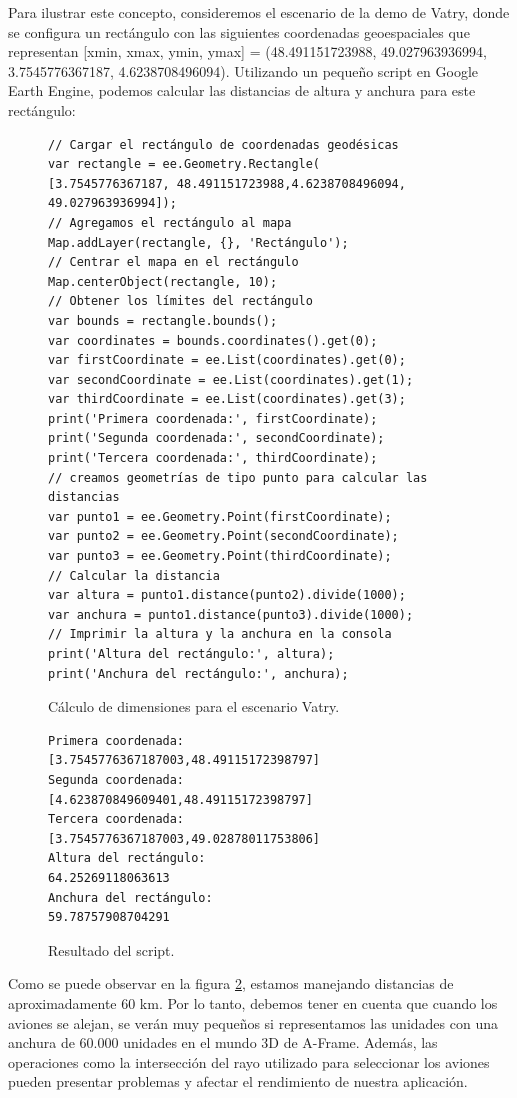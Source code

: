 \documentclass[a4paper, 11pt]{book}
\begin{document}
Para ilustrar este concepto, consideremos el escenario de la demo de Vatry, donde se configura un rectángulo con las siguientes coordenadas geoespaciales que representan [xmin, xmax, ymin, ymax] = (48.491151723988, 49.027963936994, 3.7545776367187, 4.6238708496094). Utilizando un pequeño script en Google Earth Engine, podemos calcular las distancias de altura y anchura para este rectángulo:
\begin{figure}[h]
\centering
\begin{verbatim}
// Cargar el rectángulo de coordenadas geodésicas
var rectangle = ee.Geometry.Rectangle(
[3.7545776367187, 48.491151723988,4.6238708496094, 49.027963936994]);
// Agregamos el rectángulo al mapa
Map.addLayer(rectangle, {}, 'Rectángulo');
// Centrar el mapa en el rectángulo
Map.centerObject(rectangle, 10);
// Obtener los límites del rectángulo
var bounds = rectangle.bounds();
var coordinates = bounds.coordinates().get(0);
var firstCoordinate = ee.List(coordinates).get(0);
var secondCoordinate = ee.List(coordinates).get(1);
var thirdCoordinate = ee.List(coordinates).get(3);
print('Primera coordenada:', firstCoordinate);
print('Segunda coordenada:', secondCoordinate);
print('Tercera coordenada:', thirdCoordinate);
// creamos geometrías de tipo punto para calcular las distancias
var punto1 = ee.Geometry.Point(firstCoordinate);
var punto2 = ee.Geometry.Point(secondCoordinate);
var punto3 = ee.Geometry.Point(thirdCoordinate);
// Calcular la distancia
var altura = punto1.distance(punto2).divide(1000);
var anchura = punto1.distance(punto3).divide(1000);
// Imprimir la altura y la anchura en la consola
print('Altura del rectángulo:', altura);
print('Anchura del rectángulo:', anchura);
\end{verbatim}
\caption{Cálculo de dimensiones para el escenario Vatry.
\label{codigo:dimensionesVatry}
}
\end{figure}
\begin{figure}[h]
\centering
\begin{verbatim}
Primera coordenada:
[3.7545776367187003,48.49115172398797]
Segunda coordenada:
[4.623870849609401,48.49115172398797]
Tercera coordenada:
[3.7545776367187003,49.02878011753806]
Altura del rectángulo:
64.25269118063613
Anchura del rectángulo:
59.78757908704291
\end{verbatim}
\caption{Resultado del script.
\label{codigo:resultadoDimensiones}
}
\end{figure}
Como se puede observar en la figura \ref{codigo:resultadoDimensiones}, estamos manejando distancias de aproximadamente 60 km. Por lo tanto, debemos tener en cuenta que cuando los aviones se alejan, se verán muy pequeños si representamos las unidades con una anchura de 60.000 unidades en el mundo 3D de A-Frame. Además, las operaciones como la intersección del rayo utilizado para seleccionar los aviones pueden presentar problemas y afectar el rendimiento de nuestra aplicación.
\end{document}
